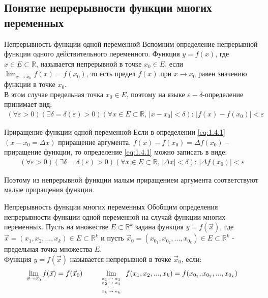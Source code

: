 \subsection{Понятие непрерывности функции многих переменных} \label{sec:1.4}

\begin{tbox}{Непрерывность функции одной переменной}
	Вспомним определение непрерывной функции одного действительного переменного. Функция \(y = f(x)\), где \(x \in E \subset \mathbb{R}\), называется непрерывной в точке \(x_0 \in E\), если $\lim_{x \to x_0} f(x) = f(x_0)$, то есть предел \(f(x)\) при \(x \to x_0\) равен значению функции в точке \(x_0\). \\

	В этом случае предельная точка \(x_0 \in E\), поэтому на языке \(\varepsilon - \delta\)-определение принимает вид:
	\begin{align} \label{eq:1.4.1}
		(\forall \varepsilon > 0)(\exists \delta = \delta(\varepsilon) > 0)(\forall x \in E \subset \mathbb{R}, \, |x - x_0| < \delta): \, |f(x) - f(x_0)| < \varepsilon
	\end{align}
\end{tbox}

\begin{tbox}{Приращение функции одной переменной}
	Если в определении \cref{eq:1.4.1} \((x - x_0 = \Delta x)\) приращение аргумента, $f(x) - f(x_0) = \Delta f(x_0)$ -- приращение функции, то определение \cref{eq:1.4.1} можно записать в виде:
	\begin{align} \label{eq:1.4.2}
		(\forall \varepsilon > 0)(\exists \delta = \delta(\varepsilon) > 0)(\forall x \in E \subset \mathbb{R}, \, |\Delta x| < \delta): \, |\Delta f(x_0)| < \varepsilon
	\end{align}

	Поэтому из непрерывной функции малым приращением аргумента соответствуют малые приращения функции.
\end{tbox}

\begin{tbox}{Непрерывность функции многих переменных}
	Обобщим определения непрерывности функции одной переменной на случай функции многих переменных. Пусть на множестве \(E \subset \mathbb{R}^k\) задана функция \(y=f(\vec{x})\), где $\vec{x} = (x_1, x_2, ..., x_k) \in E \subset \mathbb{R}^k$ и пусть $\vec{x}_0 = (x_\text{$0_1$}, x_\text{$0_2$}, ..., x_\text{$0_k$}) \in E \subset \mathbb{R}^k$ - предельная точка множества $E$.\\

	Функция $y = f(\vec{x})$ называется непрерывной в точке $\vec{x}_0$, если:
	\begin{align} \label{eq:1.4.3}
		\lim_{\vec{x} \to \vec{x}_0} f(\vec{x}) = f(\vec{x}_0) \qquad \lim_{\tiny{\begin{array}[b]{c}x_1 \to a_1\\x_2 \to a_1\\ \cdots \\ x_k \to a_k\end{array}}} f(x_1, x_2, ..., x_k) = f(x_\text{$0_1$}, x_\text{$0_2$}, ..., x_\text{$0_k$})
	\end{align}
\end{tbox}

